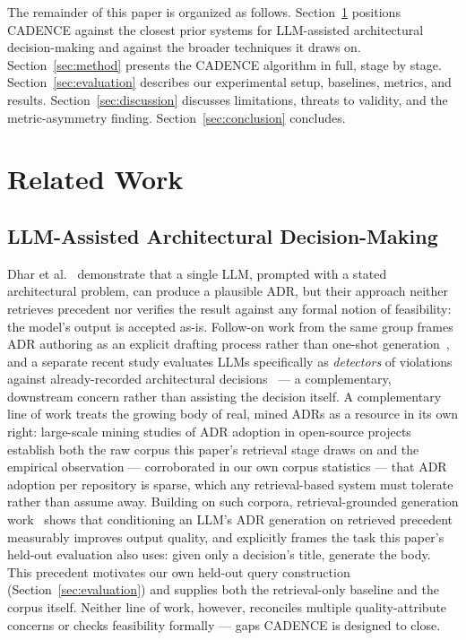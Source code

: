 \documentclass[lettersize,journal]{IEEEtran}
\begin{document}
The remainder of this paper is organized as follows. Section~\ref{sec:related} positions CADENCE against the closest prior systems for LLM-assisted architectural decision-making and against the broader techniques it draws on. Section~\ref{sec:method} presents the CADENCE algorithm in full, stage by stage. Section~\ref{sec:evaluation} describes our experimental setup, baselines, metrics, and results. Section~\ref{sec:discussion} discusses limitations, threats to validity, and the metric-asymmetry finding. Section~\ref{sec:conclusion} concludes.

\section{Related Work}
\label{sec:related}

\subsection{LLM-Assisted Architectural Decision-Making}

Dhar et al.~\cite{dhar2024llm} demonstrate that a single LLM, prompted with a stated architectural problem, can produce a plausible ADR, but their approach neither retrieves precedent nor verifies the result against any formal notion of feasibility: the model's output is accepted as-is. Follow-on work from the same group frames ADR authoring as an explicit drafting process rather than one-shot generation~\cite{dhar2025drafting}, and a separate recent study evaluates LLMs specifically as \emph{detectors} of violations against already-recorded architectural decisions~\cite{su2026violations} --- a complementary, downstream concern rather than assisting the decision itself. A complementary line of work treats the growing body of real, mined ADRs as a resource in its own right: large-scale mining studies of ADR adoption in open-source projects~\cite{buchgeher2023adr} establish both the raw corpus this paper's retrieval stage draws on and the empirical observation --- corroborated in our own corpus statistics --- that ADR adoption per repository is sparse, which any retrieval-based system must tolerate rather than assume away. Building on such corpora, retrieval-grounded generation work~\cite{contextmatters2026,contextmatters-zenodo} shows that conditioning an LLM's ADR generation on retrieved precedent measurably improves output quality, and explicitly frames the task this paper's held-out evaluation also uses: given only a decision's title, generate the body. This precedent motivates our own held-out query construction (Section~\ref{sec:evaluation}) and supplies both the retrieval-only baseline and the corpus itself. Neither line of work, however, reconciles multiple quality-attribute concerns or checks feasibility formally --- gaps CADENCE is designed to close.
\end{document}
